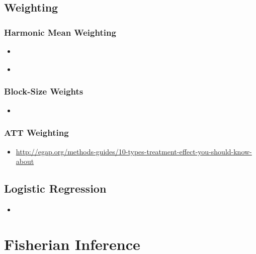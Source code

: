 \documentclass[12pt,leqno]{article}
\theoremstyle{newstyle}
\begin{document}
\subsection{Weighting}

\subsubsection{Harmonic Mean Weighting}

\begin{itemize}

\item \citet[Section 9.3.3]{hansen2011}

\item \citet[Section 2.1]{hansenbowers2008}

\end{itemize}

\subsubsection{Block-Size Weights}

\begin{itemize}

\item \citet[Section 3.6.1]{gerbergreen2012}

\end{itemize}

\subsubsection{ATT Weighting}

\begin{itemize}

\item
	\url{http://egap.org/methods-guides/10-types-treatment-effect-you-should-know-about}

\end{itemize}

\subsection{Logistic Regression}

\begin{itemize}

\item \citet{freedman2008b}

\end{itemize}

\section{Fisherian Inference}
\end{document}
